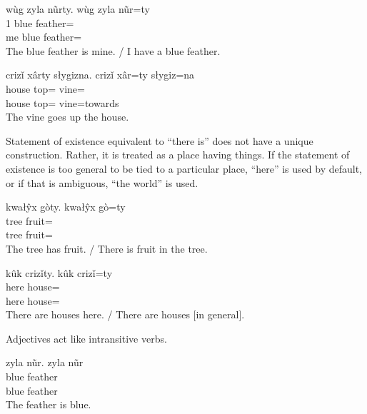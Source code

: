 \documentclass[12pt]{article}
\begin{document}
    \begin{exe}
        \ex
        \glt
        wùg zyla nũrty.
        \glll
        wùg zyla nũr=ty \\
        1\Sg{} blue feather=\Poss{} \\
        me blue feather=\Poss{} \\
        \glt
        The blue feather is mine.
        /
        I have a blue feather.
    \end{exe}

    \begin{exe}
        \ex
        \glt
        crizǐ xârty słygizna.
        \glll
        crizǐ xâr=ty słygiz=na \\
        house top=\Poss{} vine=\AdessTwo{} \\
        house top=\Poss{} vine=towards \\
        \glt
        The vine goes up the house.
    \end{exe}

    Statement of existence equivalent to ``there is''
    does not have a unique construction.
    Rather, it is treated as a place having things.
    If the statement of existence is too general
    to be tied to a particular place,
    ``here'' is used by default,
    or if that is ambiguous,
    ``the world'' is used.

    \begin{exe}
        \ex
        \glt
        kwałŷx gòty.
        \glll
        kwałŷx gò=ty \\
        tree fruit=\Poss{} \\
        tree fruit=\Poss{} \\
        \glt
        The tree has fruit.
        /
        There is fruit in the tree.
    \end{exe}

    \begin{exe}
        \ex
        \glt
        kûk crizǐty.
        \glll
        kûk crizǐ=ty \\
        here house=\Poss{} \\
        here house=\Poss{} \\
        \glt
        There are houses here.
        /
        There are houses [in general].
    \end{exe}

    Adjectives act like intransitive verbs.

    \begin{exe}
        \ex
        \glt
        zyla nũr.
        \glll
        zyla nũr \\
        blue feather \\
        blue feather \\
        \glt
        The feather is blue.
    \end{exe}
\end{document}

